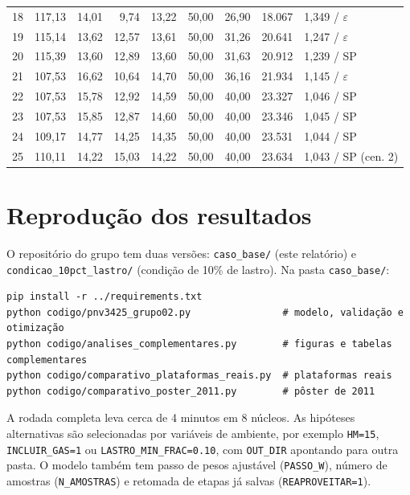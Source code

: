 \documentclass[11pt,a4paper]{article}
\begin{document}
\begin{longtable}{rrrrrrrrl}
18 & 117,13 & 14,01 & 9,74 & 13,22 & 50,00 & 26,90 & 18.067 & 1,349 / $\varepsilon$ \\
19 & 115,14 & 13,62 & 12,57 & 13,61 & 50,00 & 31,26 & 20.641 & 1,247 / $\varepsilon$ \\
20 & 115,39 & 13,60 & 12,89 & 13,60 & 50,00 & 31,63 & 20.912 & 1,239 / SP \\
21 & 107,53 & 16,62 & 10,64 & 14,70 & 50,00 & 36,16 & 21.934 & 1,145 / $\varepsilon$ \\
22 & 107,53 & 15,78 & 12,92 & 14,59 & 50,00 & 40,00 & 23.327 & 1,046 / SP \\
23 & 107,53 & 15,85 & 12,87 & 14,60 & 50,00 & 40,00 & 23.346 & 1,045 / SP \\
24 & 109,17 & 14,77 & 14,25 & 14,35 & 50,00 & 40,00 & 23.531 & 1,044 / SP \\
25 & 110,11 & 14,22 & 15,03 & 14,22 & 50,00 & 40,00 & 23.634 & 1,043 / SP (cen. 2) \\
\bottomrule
\end{longtable}

\section{Reprodução dos resultados}

O repositório do grupo tem duas versões: \texttt{caso\_base/} (este relatório) e
\texttt{condicao\_10pct\_lastro/} (condição de 10\% de lastro). Na pasta \texttt{caso\_base/}:
\begin{verbatim}
pip install -r ../requirements.txt
python codigo/pnv3425_grupo02.py                # modelo, validação e otimização
python codigo/analises_complementares.py        # figuras e tabelas complementares
python codigo/comparativo_plataformas_reais.py  # plataformas reais
python codigo/comparativo_poster_2011.py        # pôster de 2011
\end{verbatim}
A rodada completa leva cerca de 4 minutos em 8 núcleos. As hipóteses alternativas são
selecionadas por variáveis de ambiente, por exemplo
\texttt{HM=15}, \texttt{INCLUIR\_GAS=1} ou \texttt{LASTRO\_MIN\_FRAC=0.10}, com
\texttt{OUT\_DIR} apontando para outra pasta. O modelo também tem passo de pesos ajustável
(\texttt{PASSO\_W}), número de amostras (\texttt{N\_AMOSTRAS}) e retomada de etapas já salvas
(\texttt{REAPROVEITAR=1}).
\end{document}
